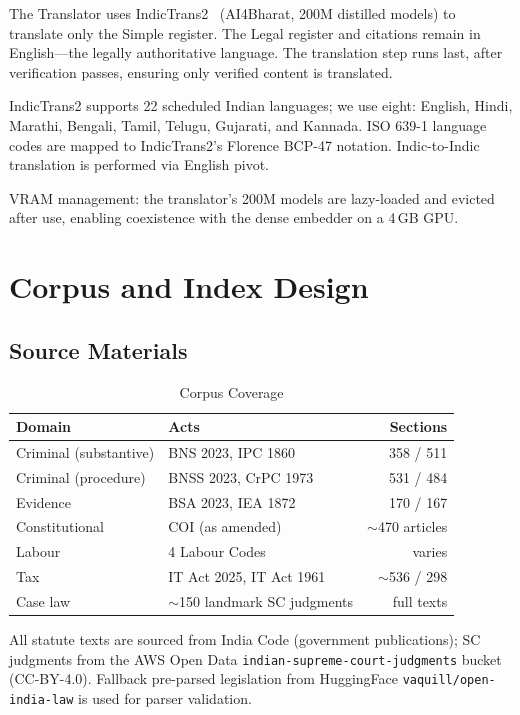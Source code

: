 \documentclass[conference]{IEEEtran}
\begin{document}
The Translator uses IndicTrans2~\cite{indictrans2} (AI4Bharat, 200M distilled models) to translate only the Simple register. The Legal register and citations remain in English---the legally authoritative language. The translation step runs last, after verification passes, ensuring only verified content is translated.

IndicTrans2 supports 22 scheduled Indian languages; we use eight: English, Hindi, Marathi, Bengali, Tamil, Telugu, Gujarati, and Kannada. ISO 639-1 language codes are mapped to IndicTrans2's Florence BCP-47 notation. Indic-to-Indic translation is performed via English pivot.

VRAM management: the translator's 200M models are lazy-loaded and evicted after use, enabling coexistence with the dense embedder on a 4\,GB GPU.

\section{Corpus and Index Design}
\label{sec:corpus}

\subsection{Source Materials}

\begin{table}[h]
\centering
\caption{Corpus Coverage}
\label{tab:corpus}
\begin{tabular}{@{}llr@{}}
\toprule
\textbf{Domain} & \textbf{Acts} & \textbf{Sections} \\
\midrule
Criminal (substantive) & BNS 2023, IPC 1860 & 358 / 511 \\
Criminal (procedure) & BNSS 2023, CrPC 1973 & 531 / 484 \\
Evidence & BSA 2023, IEA 1872 & 170 / 167 \\
Constitutional & COI (as amended) & $\sim$470 articles \\
Labour & 4 Labour Codes & varies \\
Tax & IT Act 2025, IT Act 1961 & $\sim$536 / 298 \\
Case law & $\sim$150 landmark SC judgments & full texts \\
\bottomrule
\end{tabular}
\end{table}

All statute texts are sourced from India Code (government publications); SC judgments from the AWS Open Data \texttt{indian-supreme-court-judgments} bucket (CC-BY-4.0). Fallback pre-parsed legislation from HuggingFace \texttt{vaquill/open-india-law} is used for parser validation.
\end{document}
